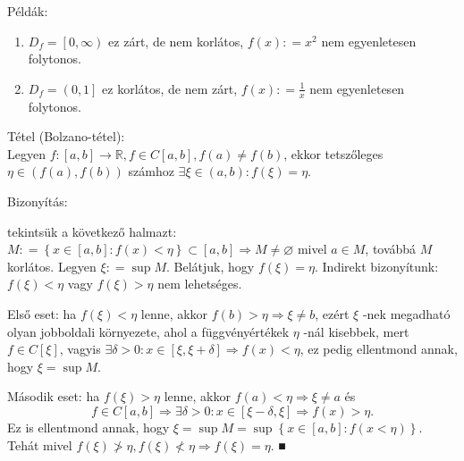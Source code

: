 \documentclass[12pt,a4paper]{scrartcl}
\providecommand{\tightlist}{%
  \setlength{\itemsep}{0pt}\setlength{\parskip}{0pt}}
\newenvironment{tetel}{}{}
\newenvironment{bizonyitas}{}{}
\newenvironment{pelda}{}{}
\begin{document}
\begin{pelda}

Példák:

\begin{enumerate}
\def\labelenumi{\arabic{enumi}.}
\tightlist
\item
  \(D_{f} = \left\lbrack {0,\infty} \right)\) ez zárt, de nem korlátos,
  \(f\left( x \right): = x^{2}\) nem egyenletesen folytonos.
\item
  \(D_{f} = \left( 0,1 \right\rbrack\) ez korlátos, de nem zárt,
  \(f\left( x \right): = \frac{1}{x}\) nem egyenletesen folytonos.
\end{enumerate}

\end{pelda}

\begin{tetel}

Tétel (Bolzano-tétel):\protect\hypertarget{bolzanotetel}{}{}\\
Legyen
\(\left. f:\left\lbrack {a,b} \right\rbrack\rightarrow{\mathbb{R}},f \in C\left\lbrack {a,b} \right\rbrack,f\left( a \right) \neq f\left( b \right) \right.\),
ekkor tetszőleges
\(\eta \in \left( {f\left( a \right),f\left( b \right)} \right)\)
számhoz
\(\exists\xi \in \left( {a,b} \right):f\left( \xi \right) = \eta\).

\end{tetel}

\begin{bizonyitas}

Bizonyítás:

tekintsük a következő halmazt:
\(\left. M: = \left\{ {x \in \left\lbrack {a,b} \right\rbrack:f\left( x \right) < \eta} \right\} \subset \left\lbrack {a,b} \right\rbrack\Rightarrow M \neq \varnothing \right.\)
mivel \(a \in M\), továbbá \(M\) korlátos. Legyen \(\xi: = \sup M\).
Belátjuk, hogy \(f\left( \xi \right) = \eta\). Indirekt bizonyítunk:
\(f\left( \xi \right) < \eta\) vagy \(f\left( \xi \right) > \eta\) nem
lehetséges.

Első eset: ha \(f\left( \xi \right) < \eta\) lenne, akkor
\(\left. f\left( b \right) > \eta\Rightarrow\xi \neq b \right.\), ezért
\(\xi\) -nek megadható olyan jobboldali környezete, ahol a
függvényértékek \(\eta\) -nál kisebbek, mert
\(f \in C\left\lbrack \xi \right\rbrack\), vagyis
\(\left. \exists\delta > 0:x \in \left\lbrack {\xi,\xi + \delta} \right\rbrack\Rightarrow f\left( x \right) < \eta \right.\),
ez pedig ellentmond annak, hogy \(\xi = \sup M\).

Második eset: ha \(f\left( \xi \right) > \eta\) lenne, akkor
\(\left. f\left( a \right) < \eta\Rightarrow\xi \neq a \right.\) és
\[\left. f \in C\left\lbrack {a,b} \right\rbrack\Rightarrow\exists\delta > 0:x \in \left\lbrack {\xi - \delta,\xi} \right\rbrack\Rightarrow f\left( x \right) > \eta. \right.\]
Ez is ellentmond annak, hogy
\(\xi = \sup M = \sup\left\{ {x \in \left\lbrack {a,b} \right\rbrack:f\left( {x < \eta} \right)} \right\}\).
Tehát mivel
\(\left. f\left( \xi \right) \ngtr \eta,f\left( \xi \right) \nless \eta\Rightarrow f\left( \xi \right) = \eta \right.\).
■

\end{bizonyitas}
\end{document}

